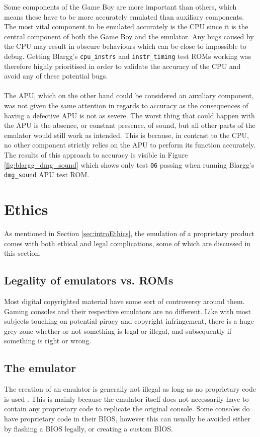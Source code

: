 Some components of the Game Boy are more important than others, which means these have to be more accurately emulated than auxiliary components. The most vital component to be emulated accurately is the CPU since it is the central component of both the Game Boy and the emulator. Any bugs caused by the CPU may result in obscure behaviours which can be close to impossible to debug. Getting Blargg's \texttt{cpu\_instrs} and \texttt{instr\_timing} \cite{Blargg} test ROMs working was therefore highly prioritised in order to validate the accuracy of the CPU and avoid any of these potential bugs.
\\\\
The APU, which on the other hand could be considered an auxiliary component, was not given the same attention in regards to accuracy as the consequences of having a defective APU is not as severe. The worst thing that could happen with the APU is the absence, or constant presence, of sound, but all other parts of the emulator would still work as intended. This is because, in contrast to the CPU, no other component strictly relies on the APU to perform its function accurately. The results of this approach to accuracy is visible in Figure \ref{fig:blargg_dmg_sound} which shows only test \texttt{06} passing when running Blargg's \texttt{dmg\_sound} \cite{Blargg} APU test ROM.


\section{Ethics}
As mentioned in Section \ref{sec:introEthics}, the emulation of a proprietary product comes with both ethical and legal complications, some of which are discussed in this section.
\label{sec:Ethics}
\subsection{Legality of emulators vs. ROMs}
Most digital copyrighted material have some sort of controversy around them. Gaming consoles and their respective emulators are no different. Like with most subjects touching on potential piracy and copyright infringement, there is a huge grey zone whether or not something is legal or illegal, and subsequently if something is right or wrong. 

\subsection{The emulator}
The creation of an emulator is generally not illegal as long as no proprietary code is used \cite{emulatorLegal}. This is mainly because the emulator itself does not necessarily have to contain any proprietary code to replicate the original console. Some consoles do have proprietary code in their BIOS, however this can usually be avoided either by flashing a BIOS legally, or creating a custom BIOS. 

